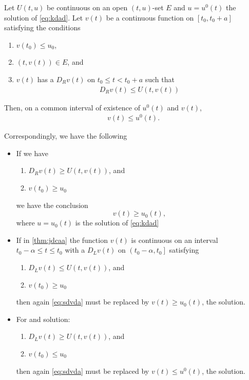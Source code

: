 \documentclass{article}
\begin{document}
\begin{thma}\label{thm:jdcaa}
Let $U(t, u)$ be continuous on an open $(t, u)$-set $E$ and $u=u^{0}(t)$ the  solution of \cref{eq:kdad}. Let $v(t)$ be a continuous function on $\left[t_{0}, t_{0}+a\right]$ satisfying the conditions
\begin{enumerate}
    \item $v\left(t_{0}\right) \le u_{0}$,
    \item $(t, v(t)) \in E$, and
    \item $v(t)$ has a  $D_{R} v(t)$ on $t_{0} \le t<t_{0}+a$ such that
\begin{align}
D_{R} v(t) \le U(t, v(t))\label{eq:udca}
\end{align}
\end{enumerate} 
Then, on a common interval of existence of $u^{0}(t)$ and $v(t)$,
\begin{align}
v(t) \le u^{0}(t).\label{eq:sdvda}
\end{align}
\end{thma}
\begin{rema}\label{re:djnz}Correspondingly, we have the following
\begin{itemize}
    \item If we have 
    \begin{enumerate}
        \item $D_{R} v(t) \ge U(t, v(t))$, and 
        \item $v\left(t_{0}\right) \ge u_{0}$
    \end{enumerate}
    we have the conclusion 
    $$v(t) \geq u_{0}(t),$$
    where $u=u_{0}(t)$ is the  solution of \cref{eq:kdad}
    \item If in \cref{thm:jdcaa} the function $v(t)$ is continuous on an interval $t_{0}-\alpha \leq t \leq t_{0}$ with a  $D_{L} v(t)$ on $\left(t_{0}-\alpha, t_{0}\right]$ satisfying
    \begin{enumerate}
        \item $D_{L} v(t) \leq U(t, v(t))$, and
        \item $v\left(t_{0}\right) \geq u_{0}$
    \end{enumerate}
    then again \cref{eq:sdvda} must be replaced by $v(t) \geq u_{0}(t)$, the  solution.
    \item For   and  solution:
    \begin{enumerate}
        \item $D_{L} v(t) \geq U(t, v(t))$, and
        \item $v\left(t_{0}\right) \leq u_{0}$
    \end{enumerate}
    then again \cref{eq:sdvda} must be replaced by $v(t) \leq u^{0}(t)$, the  solution.
\end{itemize}
\end{rema}
\end{document}
